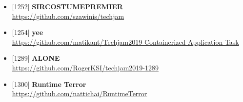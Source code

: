 \begin{itemize}[parsep=0pc]
    \item{} [1252] \textbf{SIRCOSTUMEPREMIER} \\
        \href{https://github.com/szawinis/techjam/tree/3a414629506f0ea6d943ada02f3b80685b7c289b}{\ttfamily https://github.com/szawinis/techjam}
    \item{} [1254] \textbf{yee} \\
        \href{https://github.com/matikant/Techjam2019-Containerized-Application-Task/tree/e52585dd660d3b2b7a609c083aa46e920c50b258}{\ttfamily https://github.com/matikant/Techjam2019-Containerized-Application-Task}
    \item{} [1289] \textbf{ALONE} \\
        \href{https://github.com/RogerKSI/techjam2019-1289/tree/79a81ad85e9183dc021b300af8845b78f072f39d}{\ttfamily https://github.com/RogerKSI/techjam2019-1289}
    \item{} [1300] \textbf{Runtime Terror} \\
        \href{https://github.com/nattichai/RuntimeTerror/tree/6d7ffdbad3d18568bea2373287c4dd809591afa7}{\ttfamily https://github.com/nattichai/RuntimeTerror}
\end{itemize}
